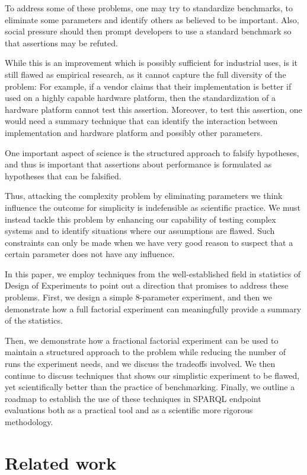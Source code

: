 \documentclass{article}
\begin{document}
To address some of these problems, one may try to standardize
benchmarks, to eliminate some parameters and identify others as
believed to be important. Also, social pressure should then prompt
developers to use a standard benchmark so that assertions may be
refuted.

While this is an improvement which is possibly sufficient for
industrial uses, is it still flawed as empirical
research, as it cannot capture the full diversity of the problem: For
example, if a vendor claims that their implementation is better if
used on a highly capable hardware platform, then the standardization
of a hardware platform cannot test this assertion. Moreover, to test
this assertion, one would need a summary technique that can identify
the interaction between implementation and hardware platform and
possibly other parameters.

One important aspect of science is the structured approach to falsify
hypotheses, and thus is important that assertions about performance is
formulated as hypotheses that can be falsified.

Thus, attacking the complexity problem by eliminating parameters we
think influence the outcome for simplicity is indefensible as
scientific practice. We must instead tackle this problem by enhancing
our capability of testing complex systems and to identify situations
where our assumptions are flawed. Such constraints can only be made
when we have very good reason to suspect that a certain parameter does
not have any influence.

In this paper, we employ techniques from the well-established field in
statistics of Design of Experiments to point out a direction that
promises to address these problems. First, we design a simple
8-parameter experiment, and then we demonstrate how a full
factorial experiment can meaningfully provide a summary of the
statistics. 

Then, we demonstrate how a fractional factorial experiment can be used
to maintain a structured approach to the problem while reducing the
number of runs the experiment needs, and we discuss the tradeoffs
involved. We then continue to discuss techniques that shows our
simplistic experiment to be flawed, yet scientifically better than the
practice of benchmarking. Finally, we outline a roadmap to establish
the use of these techniques in SPARQL endpoint evaluations both as a
practical tool and as a scientific more rigorous methodology.

\section{Related work}
\end{document}
